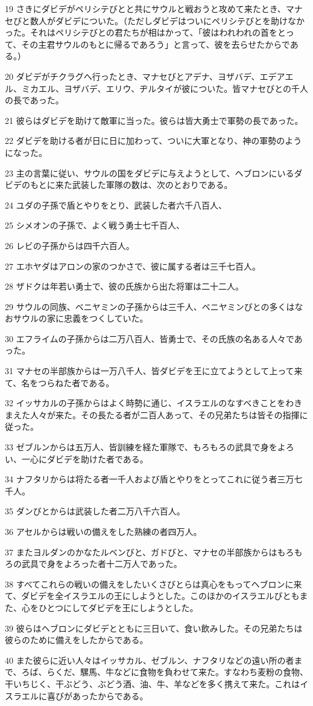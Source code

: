 \par 19 さきにダビデがペリシテびとと共にサウルと戦おうと攻めて来たとき、マナセびと数人がダビデについた。（ただしダビデはついにペリシテびとを助けなかった。それはペリシテびとの君たちが相はかって、「彼はわれわれの首をとって、その主君サウルのもとに帰るであろう」と言って、彼を去らせたからである。）
\par 20 ダビデがチクラグへ行ったとき、マナセびとアデナ、ヨザバデ、エデアエル、ミカエル、ヨザバデ、エリウ、ヂルタイが彼についた。皆マナセびとの千人の長であった。
\par 21 彼らはダビデを助けて敵軍に当った。彼らは皆大勇士で軍勢の長であった。
\par 22 ダビデを助ける者が日に日に加わって、ついに大軍となり、神の軍勢のようになった。
\par 23 主の言葉に従い、サウルの国をダビデに与えようとして、ヘブロンにいるダビデのもとに来た武装した軍隊の数は、次のとおりである。
\par 24 ユダの子孫で盾とやりをとり、武装した者六千八百人、
\par 25 シメオンの子孫で、よく戦う勇士七千百人、
\par 26 レビの子孫からは四千六百人。
\par 27 エホヤダはアロンの家のつかさで、彼に属する者は三千七百人。
\par 28 ザドクは年若い勇士で、彼の氏族から出た将軍は二十二人。
\par 29 サウルの同族、ベニヤミンの子孫からは三千人、ベニヤミンびとの多くはなおサウルの家に忠義をつくしていた。
\par 30 エフライムの子孫からは二万八百人、皆勇士で、その氏族の名ある人々であった。
\par 31 マナセの半部族からは一万八千人、皆ダビデを王に立てようとして上って来て、名をつらねた者である。
\par 32 イッサカルの子孫からはよく時勢に通じ、イスラエルのなすべきことをわきまえた人々が来た。その長たる者が二百人あって、その兄弟たちは皆その指揮に従った。
\par 33 ゼブルンからは五万人、皆訓練を経た軍隊で、もろもろの武具で身をよろい、一心にダビデを助けた者である。
\par 34 ナフタリからは将たる者一千人および盾とやりをとってこれに従う者三万七千人。
\par 35 ダンびとからは武装した者二万八千六百人。
\par 36 アセルからは戦いの備えをした熟練の者四万人。
\par 37 またヨルダンのかなたルベンびと、ガドびと、マナセの半部族からはもろもろの武具で身をよろった者十二万人であった。
\par 38 すべてこれらの戦いの備えをしたいくさびとらは真心をもってヘブロンに来て、ダビデを全イスラエルの王にしようとした。このほかのイスラエルびともまた、心をひとつにしてダビデを王にしようとした。
\par 39 彼らはヘブロンにダビデとともに三日いて、食い飲みした。その兄弟たちは彼らのために備えをしたからである。
\par 40 また彼らに近い人々はイッサカル、ゼブルン、ナフタリなどの遠い所の者まで、ろば、らくだ、騾馬、牛などに食物を負わせて来た。すなわち麦粉の食物、干いちじく、干ぶどう、ぶどう酒、油、牛、羊などを多く携えて来た。これはイスラエルに喜びがあったからである。

